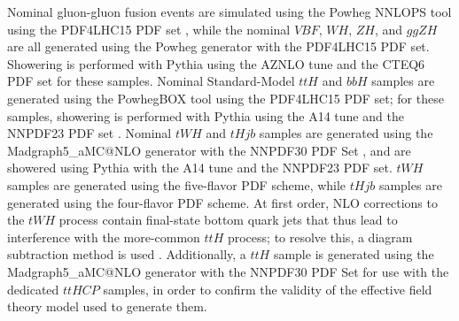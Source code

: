 \begin{table}[h!]
  \centering
  \caption{Summary of nominal signal samples}
  \label{tab:signal_samples_pyt}
\end{table}

Nominal gluon-gluon fusion events are simulated using the Powheg NNLOPS tool \cite{NNLOPS} using the PDF4LHC15 PDF set \cite{PDF4LHC}, while the nominal $VBF$, $WH$, $ZH$, and $ggZH$ are all generated using the Powheg generator with the PDF4LHC15 PDF set. Showering is performed with Pythia using the AZNLO tune \cite{AZNLO} and the CTEQ6 PDF set \cite{CTEQ6} for these samples. Nominal Standard-Model $ttH$ and $bbH$ samples are generated using the PowhegBOX tool \cite{PowhegBox} using the PDF4LHC15 PDF set; for these samples, showering is performed with Pythia using the A14 tune \cite{A14} and the NNPDF23 PDF set \cite{NNPDF23}. Nominal $tWH$ and $tHjb$ samples are generated using the Madgraph5\_aMC@NLO generator with the NNPDF30 PDF Set \cite{NNPDF30}, and are showered using Pythia with the A14 tune and the NNPDF23 PDF set. $tWH$ samples are generated using the five-flavor PDF scheme, while $tHjb$ samples are generated using the four-flavor PDF scheme. At first order, NLO corrections to the $tWH$ process contain final-state bottom quark jets that thus lead to interference with the more-common $ttH$ process; to resolve this, a diagram subtraction method is used \cite{FedericotWH} \cite{subtraction}. Additionally, a $ttH$ sample is generated using the Madgraph5\_aMC@NLO generator with the NNPDF30 PDF Set \cite{NNPDF30} for use with the dedicated $ttH CP$ samples, in order to confirm the validity of the effective field theory model used to generate them.

